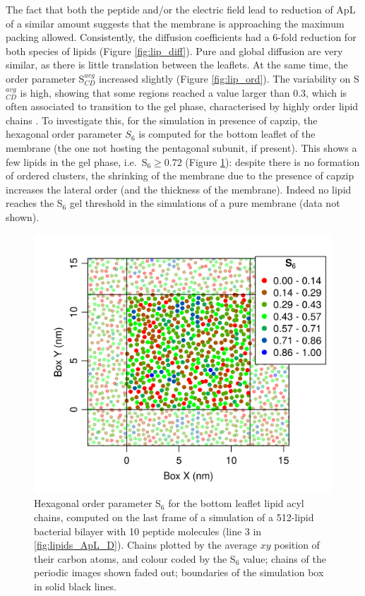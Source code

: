 The fact that both the peptide and/or the electric field lead to reduction of ApL of a similar amount suggests that the membrane is approaching the maximum packing allowed.
%
Consistently, the diffusion coefficients had a 6-fold reduction for both species of lipids (Figure \ref{fig:lip_diff}). Pure and global diffusion are very similar, as there is little translation between the leaflets.
%
At the same time, the order parameter S$^{avg}_{CD}$ increased slightly (Figure \ref{fig:lip_ord}). The variability on S$^{avg}_{CD}$ is high, showing that some regions reached a value larger than 0.3, which is often associated to transition to the gel phase, characterised by highly order lipid chains \citep{Pluhackova2016}.
%
To investigate this, for the simulation in presence of capzip, the hexagonal order parameter $S_6$ is computed for the bottom leaflet of the membrane (the one not hosting the pentagonal subunit, if present). This shows a few lipids in the gel phase, i.e.\ S$_6 \ge 0.72$ (Figure \ref{fig:S6_pb4}): despite there is no formation of ordered clusters, the shrinking of the membrane due to the presence of capzip increases the lateral order (and the thickness of the membrane). Indeed no lipid reaches the S$_6$ gel threshold in the simulations of a pure membrane (data not shown).
%
\begin{figure}
\centering
\includegraphics[width=0.5\linewidth]{3results_capsule/pics/pb4_S6.png} 
\caption[Lipid hexagonal order parameter in an atomistic protein-lipid simulation]{Hexagonal order parameter S$_6$ for the bottom leaflet lipid acyl chains, computed on the last frame of a simulation of a 512-lipid bacterial bilayer with 10 peptide molecules (line 3 in \ref{fig:lipids_ApL_D}). Chains plotted by the average $xy$ position of their carbon atoms, and colour coded by the S$_6$ value; chains of the periodic images shown faded out; boundaries of the simulation box in solid black lines.}
\label{fig:S6_pb4}
\end{figure}

